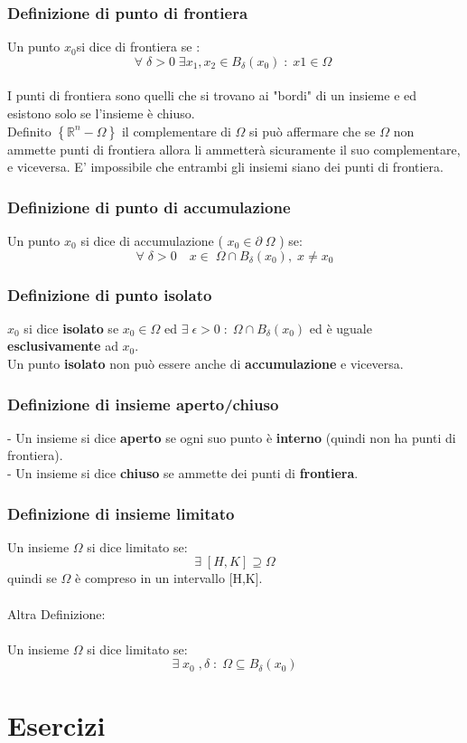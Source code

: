 \documentclass[fontsize = 20px, paper = a4]{article}
\begin{document}
\subsubsection{Definizione di punto di frontiera}
Un punto $x_0$si dice di frontiera se :
$$\forall \; \delta >0 \; \exists x_1,x_2 \in B_\delta(x_0) \; : \; x1 \in \Omega \; $$ \\
I punti di frontiera sono quelli che si trovano ai "bordi" di un insieme e ed esistono solo se l'insieme è chiuso. \\
Definito $\left \{ \mathbb{R}^n - \Omega \right \}$ il complementare di $\Omega$ si può affermare che se $\Omega$ non ammette punti di frontiera allora li ammetterà sicuramente il suo complementare, e viceversa. E' impossibile che entrambi gli insiemi siano dei punti di frontiera.
\subsubsection{Definizione di punto di accumulazione}
Un punto $x_0$ si dice di accumulazione ( $x_0 \in \partial \; \Omega$ ) se:
$$\forall \; \delta > 0 \quad x \in \; \Omega \cap B_\delta \left(x_0 \right), \; x \neq x_0$$
\subsubsection{Definizione di punto isolato}
$x_0$ si dice \textbf{isolato} se $x_0 \in \Omega$ ed $\exists \; \epsilon > 0 \; : \; \Omega \cap B_\delta(x_0)$ ed è uguale \textbf{esclusivamente} ad $x_0$. \\
Un punto \textbf{isolato} non può essere anche di \textbf{accumulazione} e viceversa.
\subsubsection{Definizione di insieme aperto/chiuso}
- Un insieme si dice \textbf{aperto} se ogni suo punto è \textbf{interno} (quindi non ha punti di frontiera). \\
- Un insieme si dice \textbf{chiuso} se ammette dei punti di \textbf{frontiera}.
\subsubsection{Definizione di insieme limitato}
Un insieme $\Omega$ si dice limitato se:
$$\exists \; [H,K] \supseteq \Omega$$
quindi se $\Omega$ è compreso in un intervallo [H,K].\\\\
Altra Definizione: \\ \\
Un insieme $\Omega$ si dice limitato se:
$$\exists \; x_0 \; , \delta \; : \; \Omega \subseteq B_\delta(x_0)$$

\section{Esercizi}
\end{document}
